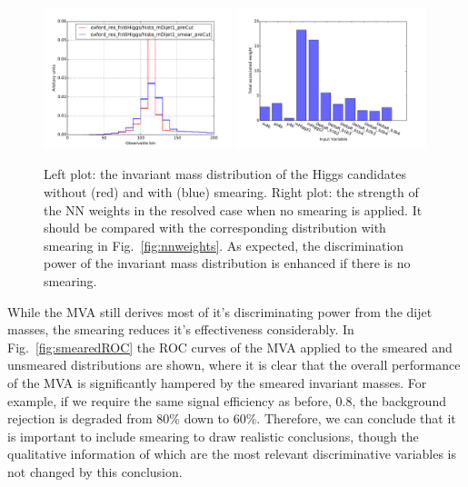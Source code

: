 \begin{figure}[t]
\begin{center}
\includegraphics[width=0.49\textwidth]{plots/Msmear/histo_mass_smear_precut.pdf}
\includegraphics[width=0.49\textwidth]{plots/Msmear/nnweights.pdf}
\caption{\small Left plot: the invariant mass distribution of the
  Higgs candidates without (red) and with (blue) smearing.
  Right plot: the strength of the NN weights in the resolved case when no smearing
  is applied.
  It should be compared with the corresponding distribution with smearing in
  Fig.~\ref{fig:nnweights}.
  As expected, the discrimination power of the invariant mass distribution is
  enhanced if there is no smearing.}
\label{fig:invMsmear}
\end{center}
\end{figure}
  

While the MVA still derives most of it's discriminating power from the dijet masses, the smearing reduces it's effectiveness considerably.
%
In Fig.~\ref{fig:smearedROC} the ROC curves of the MVA applied to the smeared and unsmeared distributions are shown, where it is clear that the overall performance of the MVA is significantly hampered by the smeared invariant masses.
%
For example, if we require the same signal efficiency as before, 0.8, the background rejection
is degraded from 80\% down to 60\%.
%
Therefore, we can conclude that it is important to include smearing to draw realistic
conclusions, though the qualitative information of which are the most relevant
discriminative variables is not changed by this conclusion.


